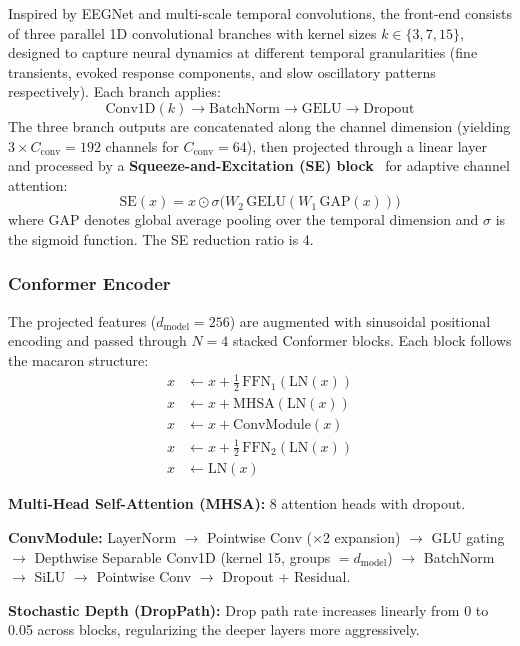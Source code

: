 \documentclass[11pt,a4paper]{article}
\begin{document}
Inspired by EEGNet and multi-scale temporal convolutions, the front-end
consists of three parallel 1D convolutional branches with kernel sizes
$k \in \{3, 7, 15\}$, designed to capture neural dynamics at different temporal
granularities (fine transients, evoked response components, and slow oscillatory
patterns respectively). Each branch applies:
\[
  \text{Conv1D}(k) \to \text{BatchNorm} \to \text{GELU} \to \text{Dropout}
\]
The three branch outputs are concatenated along the channel dimension (yielding
$3 \times C_{\text{conv}} = 192$ channels for $C_{\text{conv}} = 64$), then
projected through a linear layer and processed by a
\textbf{Squeeze-and-Excitation (SE) block}~\cite{hu2018} for adaptive channel
attention:
\[
  \text{SE}(x) = x \odot \sigma\!\bigl(W_2\,\text{GELU}(W_1\,\text{GAP}(x))\bigr)
\]
where GAP denotes global average pooling over the temporal dimension and
$\sigma$ is the sigmoid function. The SE reduction ratio is 4.

\subsubsection{Conformer Encoder}

The projected features ($d_{\text{model}} = 256$) are augmented with sinusoidal
positional encoding and passed through $N = 4$ stacked Conformer blocks. Each
block follows the macaron structure:
\begin{align*}
  x &\leftarrow x + \tfrac{1}{2}\,\text{FFN}_1(\text{LN}(x))\\
  x &\leftarrow x + \text{MHSA}(\text{LN}(x))\\
  x &\leftarrow x + \text{ConvModule}(x)\\
  x &\leftarrow x + \tfrac{1}{2}\,\text{FFN}_2(\text{LN}(x))\\
  x &\leftarrow \text{LN}(x)
\end{align*}

\textbf{Multi-Head Self-Attention (MHSA):} 8 attention heads with dropout.

\textbf{ConvModule:} LayerNorm $\to$ Pointwise Conv ($\times$2 expansion)
$\to$ GLU gating $\to$ Depthwise Separable Conv1D (kernel 15,
groups $= d_{\text{model}}$) $\to$ BatchNorm $\to$ SiLU $\to$ Pointwise Conv
$\to$ Dropout + Residual.

\textbf{Stochastic Depth (DropPath):} Drop path rate increases linearly from 0
to 0.05 across blocks, regularizing the deeper layers more aggressively.
\end{document}
